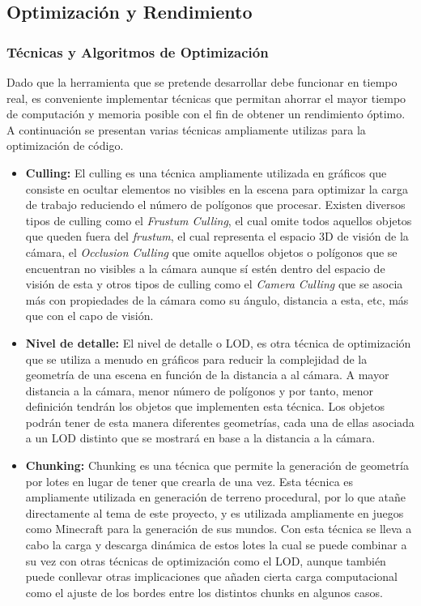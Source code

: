         \subsection{Optimización y Rendimiento}
            
            \subsubsection{Técnicas y Algoritmos de Optimización}
                Dado que la herramienta que se pretende desarrollar debe funcionar en tiempo real, es conveniente implementar técnicas que permitan ahorrar el mayor tiempo de computación y memoria posible con el fin de obtener un rendimiento óptimo. A continuación se presentan varias técnicas ampliamente utilizas para la optimización de código.
                \begin{itemize}
                    \item \textbf{Culling:} El culling es una técnica ampliamente utilizada en gráficos que consiste en ocultar elementos no visibles en la escena para optimizar la carga de trabajo reduciendo el número de polígonos que procesar. Existen diversos tipos de culling como el \textit{Frustum Culling}, el cual omite todos aquellos objetos que queden fuera del \textit{frustum}, el cual representa el espacio 3D de visión de la cámara, el \textit{Occlusion Culling} que omite aquellos objetos o polígonos que se encuentran no visibles a la cámara aunque sí estén dentro del espacio de visión de esta y otros tipos de culling como el \textit{Camera Culling} que se asocia más con propiedades de la cámara como su ángulo, distancia a esta, etc, más que con el capo de visión.
                    \item \textbf{Nivel de detalle:} El nivel de detalle o LOD, es otra técnica de optimización que se utiliza a menudo en gráficos para reducir la complejidad de la geometría de una escena en función de la distancia a al cámara. A mayor distancia a la cámara, menor número de polígonos y por tanto, menor definición tendrán los objetos que implementen esta técnica. Los objetos podrán tener de esta manera diferentes geometrías, cada una de ellas asociada a un LOD distinto que se mostrará en base a la distancia a la cámara.
                    \item \textbf{Chunking:} Chunking es una técnica que permite la generación de geometría por lotes en lugar de tener que crearla de una vez. Esta técnica es ampliamente utilizada en generación de terreno procedural, por lo que atañe directamente al tema de este proyecto, y es utilizada ampliamente en juegos como Minecraft para la generación de sus mundos. Con esta técnica se lleva a cabo la carga y descarga dinámica de estos lotes la cual se puede combinar a su vez con otras técnicas de optimización como el LOD, aunque también puede conllevar otras implicaciones que añaden cierta carga computacional como el ajuste de los bordes entre los distintos chunks en algunos casos.

\end{itemize}
